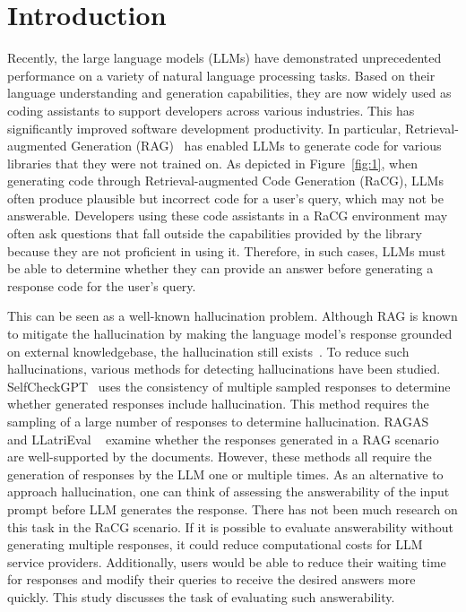 
\section{Introduction}
Recently, the large language models (LLMs) have demonstrated unprecedented performance on a variety of natural language processing tasks. Based on their language understanding and generation capabilities, they are now widely used as coding assistants to support developers across various industries. This has significantly improved software development productivity. In particular, Retrieval-augmented Generation (RAG)~\cite{shuster2021RAGreducehalu} has enabled LLMs to generate code for various libraries that they were not trained on.
As depicted in Figure~\ref{fig:1}, when generating code through Retrieval-augmented Code Generation (RaCG), LLMs often produce plausible but incorrect code for a user's query, which may not be answerable. Developers using these code assistants in a RaCG environment may often ask questions that fall outside the capabilities provided by the library because they are not proficient in using it. Therefore, in such cases, LLMs must be able to determine whether they can provide an answer before generating a response code for the user's query.



This can be seen as a well-known hallucination problem. Although RAG is known to mitigate the hallucination by making the language model's response grounded on external knowledgebase, the hallucination still exists~\cite{esetal2024ragas,li-etal-2024-llatrieval}. To reduce such hallucinations, various methods for detecting hallucinations have been studied. SelfCheckGPT~\cite{manakul2023selfcheckgpt} uses the consistency of multiple sampled responses to determine whether generated responses include hallucination. This method requires the sampling of a large number of responses to determine hallucination. RAGAS~\cite{esetal2024ragas} and LLatriEval ~\cite{li-etal-2024-llatrieval} examine whether the responses generated in a RAG scenario are well-supported by the documents. However, these methods all require the generation of responses by the LLM one or multiple times. 
As an alternative to approach hallucination, one can think of assessing the answerability of the input prompt before LLM generates the response. There has not been much research on this task in the RaCG scenario. If it is possible to evaluate answerability without generating multiple responses, it could reduce computational costs for LLM service providers. Additionally, users would be able to reduce their waiting time for responses and modify their queries to receive the desired answers more quickly. This study discusses the task of evaluating such answerability.

